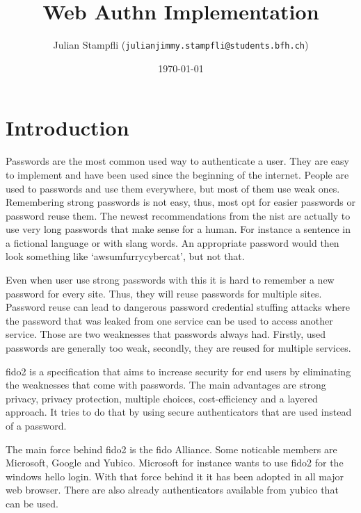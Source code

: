 \documentclass[a4paper, 11pt]{scrartcl}
\begin{document}
\title{Web Authn Implementation}
\date{\today} 
\author{ Julian Stampfli (\texttt{julianjimmy.stampfli@students.bfh.ch}) }
\maketitle
\setcounter{tocdepth}{2}
\tableofcontents
\clearpage

\section{Introduction}

Passwords are the most common used way to authenticate a user. They are easy to implement and have been used since the beginning of the internet. People are used to passwords and use them everywhere, but most of them use weak ones. Remembering strong passwords is not easy, thus, most opt for easier passwords or password reuse them. The newest recommendations from the \gls{nist} are actually to use very long passwords that make sense for a human. For instance a sentence in a fictional language or with slang words. An appropriate password would then look something like `awsumfurrycybercat', but not that. \cite{nist:pw:blog}

Even when user use strong passwords with this it is hard to remember a new password for every site. Thus, they will reuse passwords for multiple sites. Password reuse can lead to dangerous password credential stuffing attacks where the password that was leaked from one service can be used to access another service. \cite{panda:pwreuse, xkcd:pwreuse} Those are two weaknesses that passwords always had. Firstly, used passwords are generally too weak, secondly, they are reused for multiple services. 

\gls{fido2} is a specification that aims to increase security for end users by eliminating the weaknesses that come with passwords. The main advantages are strong privacy, privacy protection, multiple choices, cost-efficiency and a layered approach. It tries to do that by using secure authenticators that are used instead of a password. \cite{yubico:whatIsFido2} 

The main force behind \gls{fido2} is the \gls{fido} Alliance. Some noticable members are Microsoft, Google and Yubico. Microsoft for instance wants to use \gls{fido2} for the windows hello login. \cite{yubico:ms} With that force behind it it has been adopted in all major web browser. \cite{fido:browser} There are also already authenticators available from yubico that can be used. \cite{yubico:yubikey5}
\end{document}
